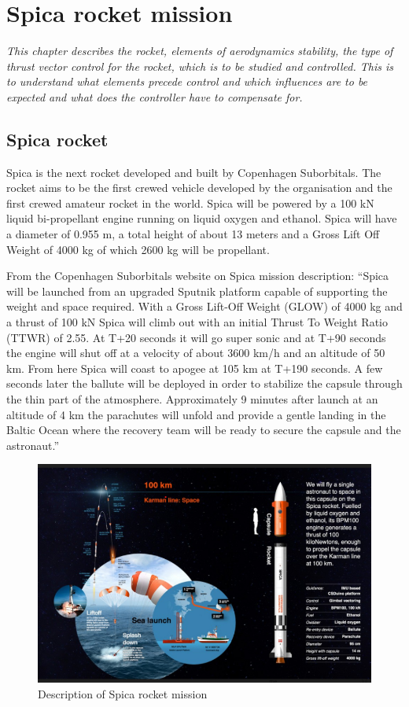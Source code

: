 \chapter{Spica rocket mission }
\textit{This chapter describes the rocket, elements of aerodynamics stability, the type of thrust vector control for the rocket, which is to be studied and controlled.  This is to understand what elements precede control and which influences are to be expected and what does the controller have to compensate for.}
\section{Spica rocket}
Spica is the next rocket developed and built by Copenhagen Suborbitals. The rocket aims to be the first crewed vehicle developed by the organisation and the first crewed amateur rocket in the world. Spica will be powered by a 100 kN liquid bi-propellant engine running on liquid oxygen and ethanol. Spica will have a diameter of 0.955 m, a total height of about 13 meters and a Gross Lift Off Weight of 4000 kg of which 2600 kg will be propellant.

From the Copenhagen Suborbitals website on Spica mission description: “Spica will be launched from an upgraded Sputnik platform capable of supporting the weight and space required. With a Gross Lift-Off Weight (GLOW) of 4000 kg and a thrust of 100 kN Spica will climb out with an initial Thrust To Weight Ratio (TTWR) of 2.55. 
At T+20 seconds it will go super sonic and at T+90 seconds the engine will shut off at a velocity of about 3600 km/h and an altitude of 50 km. 
From here Spica will coast to apogee at 105 km at T+190 seconds. A few seconds later the ballute will be deployed in order to stabilize the capsule through the thin part of the atmosphere. 
Approximately 9 minutes after launch at an altitude of 4 km the parachutes will unfold and provide a gentle landing in the Baltic Ocean where the recovery team will be ready to secure the capsule and the astronaut.”

\begin{figure}[h!]
  \includegraphics[scale=0.8]{graphics/Karman.png}
  \caption{Description of Spica rocket mission }
  \label{Spica mission}
\end{figure}

